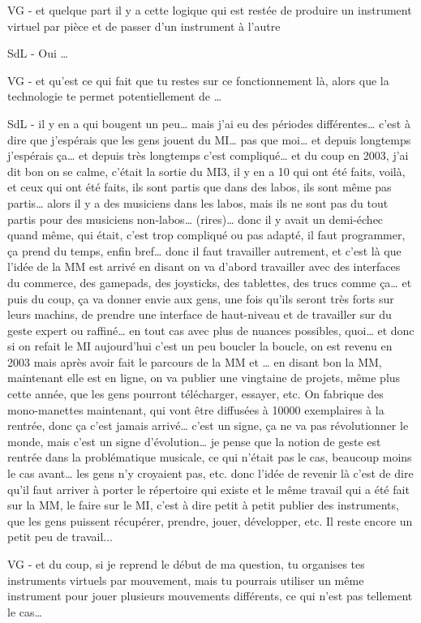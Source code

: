 VG - et quelque part il y a cette logique qui est restée de produire un instrument virtuel par pièce et de passer d'un instrument à l'autre 

SdL - Oui … 

VG - et qu'est ce qui fait que tu restes sur ce fonctionnement là, alors que la technologie te permet potentiellement de … 

SdL - il y en a qui bougent un peu… mais j'ai eu des périodes différentes… c'est à dire que j'espérais que les gens jouent du MI… pas que moi… et depuis longtemps j'espérais ça… et depuis très longtemps c'est compliqué… et du coup en 2003, j'ai dit bon on se calme, c'était la sortie du MI3, il y en a 10 qui ont été faits, voilà, et ceux qui ont été faits, ils sont partis que dans des labos, ils sont même pas partis… alors il y a des musiciens dans les labos, mais ils ne sont pas du tout partis pour des musiciens non-labos… (rires)… donc il y avait un demi-échec quand même, qui était, c'est trop compliqué ou pas adapté, il faut programmer, ça prend du temps, enfin bref… donc il faut travailler autrement, et c'est là que l'idée de la MM est arrivé en disant on va d'abord travailler avec des interfaces du commerce, des gamepads, des joysticks, des tablettes, des trucs comme ça… et puis du coup, ça va donner envie aux gens, une fois qu'ils seront très forts sur leurs machins, de prendre une interface de haut-niveau et de travailler sur du geste expert ou raffiné… en tout cas avec plus de nuances possibles, quoi… et donc si on refait le MI aujourd'hui c'est un peu boucler la boucle, on est revenu en 2003 mais après avoir fait le parcours de la MM et … en disant bon la MM, maintenant elle est en ligne, on va publier une vingtaine de projets, même plus cette année, que les gens pourront télécharger, essayer, etc. On fabrique des mono-manettes maintenant, qui vont être diffusées à 10000 exemplaires à la rentrée, donc ça c'est jamais arrivé… c'est un signe, ça ne va pas révolutionner le monde, mais c'est un signe d'évolution… je pense que la notion de geste est rentrée dans la problématique musicale, ce qui n'était pas le cas, beaucoup moins le cas avant… les gens n'y croyaient pas, etc. donc l'idée de revenir là c'est de dire qu'il faut arriver à porter le répertoire qui existe et le même travail qui a été fait sur la MM, le faire sur le MI, c'est à dire petit à petit publier des instruments, que les gens puissent récupérer, prendre, jouer, développer, etc. Il reste encore un petit peu de travail...  

VG - et du coup, si je reprend le début de ma question, tu organises tes instruments virtuels par mouvement, mais tu pourrais utiliser un même instrument pour jouer plusieurs mouvements différents, ce qui n'est pas tellement le cas… 

